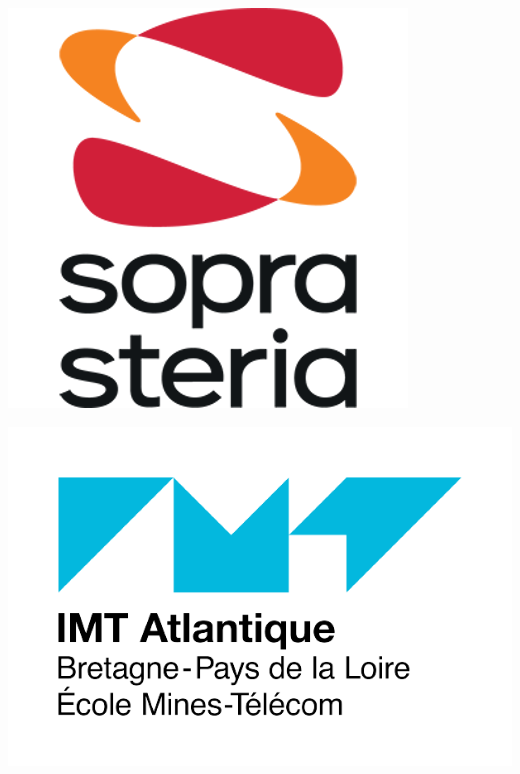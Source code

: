 \begin{titlepage}
\newcommand{\HRule}{\rule{\linewidth}{0.5mm}} %
\center %

\vspace*{-1cm}
\begin{minipage}{0.32\textwidth}
    \centering
    \includegraphics[scale=0.22]{figures/soprasteria.png}
\end{minipage}
\hfill
\begin{minipage}{0.32\textwidth}
    \centering
    \includegraphics[scale=0.2]{figures/IMTA.png}
\end{minipage}


\end{titlepage}
